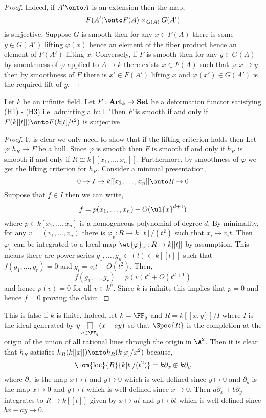 \documentclass[12pt]{article}
\begin{document}
\begin{proof}
Indeed, if $A' \onto A$ is an extension then the map,
\[ F(A') \onto F(A) \times_{G(A)} G(A') \]
is surjective. Suppose $G$ is smooth then for any $x \in F(A)$ there is some $y \in G(A')$ lifting $\varphi(x)$ hence an element of the fiber product hence an element of $F(A')$ lifting $x$. Conversely, if $F$ is smooth then for any $y \in G(A)$ by smoothness of $\varphi$ applied to $A \to k$ there exists $x \in F(A)$ such that $\varphi : x \mapsto y$ then by smoothness of $F$ there is $x' \in F(A')$ lifting $x$ and $\varphi(x') \in G(A')$ is the required lift of $y$. 
\end{proof}


\begin{lemma}
Let $k$ be an infinite field. Let $F : \mathbf{Art}_k \to \mathbf{Set}$ be a deformation functor satisfying (H1) - (H3) i.e. admitting a hull. Then $F$ is smooth if and only if $F(k[[t]]) \onto F(k[t]/t^2)$ is surjective 
\end{lemma}

\begin{proof}
It is clear we only need to show that if the lifting criterion holds then 
Let $\varphi : h_R \to F$ be a hull. Since $\varphi$ is smooth then $F$ is smooth if and only if $h_R$ is smooth if and only if $R \cong k[[x_1, \dots, x_n]]$. Furthermore, by smoothness of $\varphi$ we get the lifting criterion for $h_R$. Consider a minimal presentation,
\[ 0 \to I \to k[[x_1, \dots, x_n]] \onto R \to 0 \]
Suppose that $f \in I$ then we can write,
\[ f = p(x_1, \dots, x_n) + O(\ul{x}^{d+1}) \]
where $p \in k[x_1, \dots, x_n]$ is a homogeneous polynomial of degree $d$. By minimality, for any $v = (v_1, \dots, v_n)$ there is $\varphi_v : R \to k[t]/(t^2)$ such that $x_i \mapsto v_i t$. Then $\varphi_v$ can be integrated to a local map $\wt{\varphi}_v : R \to k[[t]]$ by assumption. This means there are power series $g_1, \dots, g_n \in (t) \subset k[[t]]$ such that $f(g_1, \dots, g_r) = 0$ and $g_i = v_i t + O(t^2)$. Then,
\[ f(g_1, \dots, g_r) = p(v) t^d + O(t^{d+1}) \]
and hence $p(v) = 0$ for all $v \in k^n$. Since $k$ is infinite this implies that $p = 0$ and hence $f = 0$ proving the claim.
\end{proof}

\begin{rmk}
This is false if $k$ is finite. Indeed, let $k = \FF_q$ and $R = k[[x,y]]/I$ where $I$ is the ideal generated by $y \prod\limits_{a \in \FF_q} (x - ay)$ so that $\Spec{R}$ is the completion at the origin of the union of all rational lines through the origin in $\A^2$. Then it is clear that $h_R$ satisfies $h_R(k[[x]]) \onto h_R(k[x]/x^2)$ because,
\[ \Hom{\text{loc}}{R}{k[t]/(t^2)} = k \partial_x \oplus k \partial_y \]
where $\partial_x$ is the map $x \mapsto t$ and $y \mapsto 0$ which is well-defined since $y \mapsto 0$ and $\partial_y$ is the map $x \mapsto 0$ and $y \mapsto t$ which is well-defined since $x \mapsto 0$. Then $a \partial_x + b \partial_y$ integrates to $R \to k[[t]]$ given by $x \mapsto a t$ and $y \mapsto b t$ which is well-defined since $bx - ay \mapsto 0$. 
\end{rmk}
\end{document}
